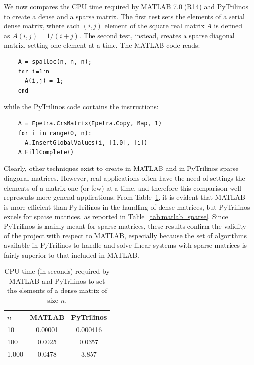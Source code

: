\documentclass[10pt,relax]{SANDreport}
\begin{document}
We now compares the CPU time required by MATLAB 7.0 (R14) and
PyTrilinos to create a dense and a sparse matrix.
The first test sets the elements
of a serial dense matrix, where each $(i,j)$ element of the square real
matrix $A$ is defined as $A(i,j) = 1/(i + j)$. The second test,
instead, creates a sparse diagonal matrix, setting one element
at-a-time. The MATLAB code reads:
\begin{verbatim}
    A = spalloc(n, n, n);
    for i=1:n
      A(i,j) = 1;
    end
\end{verbatim}
while the PyTrilinos code contains the instructions:
\begin{verbatim}
    A = Epetra.CrsMatrix(Epetra.Copy, Map, 1)
    for i in range(0, n):
      A.InsertGlobalValues(i, [1.0], [i])
    A.FillComplete()
\end{verbatim}
Clearly, other techniques exist to create in MATLAB and in
PyTrilinos sparse diagonal matrices. However, real applications
often have the need of settings the elements of a matrix one (or
few) at-a-time, and therefore this comparison well represents more
general applications. From Table~\ref{tab:matlab_dense},
  it is evident that MATLAB is more efficient than PyTrilinos in the handling
  of dense matrices, but PyTrilinos excels for sparse matrices, as reported in
  Table~\ref{tab:matlab_sparse}. Since PyTrilinos is mainly meant for sparse
  matrices, these results confirm the validity of the project with respect to
  MATLAB, especially because the set of algorithms available in PyTrilinos to
  handle and solve linear systems with sparse matrices is fairly superior to
  that included in MATLAB.

\begin{table}
\begin{center}
\begin{tabular}{| l | c | c |}
\hline
$n$ & MATLAB & PyTrilinos \\
\hline
\hline
10     & 0.00001 & 0.000416 \\
100    & 0.0025 & 0.0357 \\
1,000  & 0.0478 & 3.857 \\
\hline
\end{tabular}
\caption{CPU time (in seconds) required by MATLAB and PyTrilinos to set the
  elements of a  dense matrix of size $n$.}
\label{tab:matlab_dense}
\end{center}
\end{table}
\end{document}
